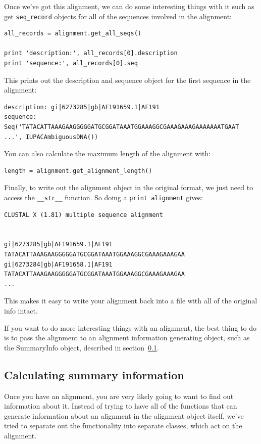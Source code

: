 \documentclass{report}
\begin{document}
Once we've got this alignment, we can do some interesting things with it such as get \verb|seq_record| objects for all of the sequences involved in the alignment:

\begin{verbatim}
all_records = alignment.get_all_seqs()

print 'description:', all_records[0].description
print 'sequence:', all_records[0].seq
\end{verbatim}

This prints out the description and sequence object for the first sequence in the alignment:

\begin{verbatim}
description: gi|6273285|gb|AF191659.1|AF191
sequence: Seq('TATACATTAAAGAAGGGGGATGCGGATAAATGGAAAGGCGAAAGAAAGAAAAAAATGAAT 
...', IUPACAmbiguousDNA())
\end{verbatim}

You can also calculate the maximum length of the alignment with:

\begin{verbatim}
length = alignment.get_alignment_length()
\end{verbatim}

Finally, to write out the alignment object in the original format, we just need to access the \verb|__str__| function. So doing a \verb|print alignment| gives:

\begin{verbatim}
CLUSTAL X (1.81) multiple sequence alignment


gi|6273285|gb|AF191659.1|AF191      TATACATTAAAGAAGGGGGATGCGGATAAATGGAAAGGCGAAAGAAAGAA
gi|6273284|gb|AF191658.1|AF191      TATACATTAAAGAAGGGGGATGCGGATAAATGGAAAGGCGAAAGAAAGAA
...
\end{verbatim}

This makes it easy to write your alignment back into a file with all of the original info intact.


If you want to do more interesting things with an alignment, the best thing to do is to pass the alignment to an alignment information generating object, such as the SummaryInfo object, described in section~\ref{sec:summary_info}.

\subsection{Calculating summary information}
\label{sec:summary_info}

Once you have an alignment, you are very likely going to want to find out information about it. Instead of trying to have all of the functions that can generate information about an alignment in the alignment object itself, we've tried to separate out the functionality into separate classes, which act on the alignment. 
\end{document}
